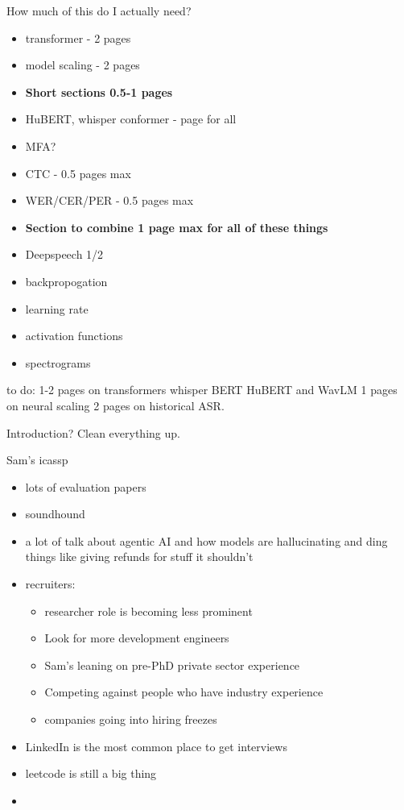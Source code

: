 How much of this do I actually need?
\begin{itemize}
    \item transformer - 2 pages
    \item model scaling - 2 pages
    \item \textbf{Short sections 0.5-1 pages}
    \item HuBERT, whisper conformer - page for all
    \item MFA?
    \item CTC - 0.5 pages max
    \item WER/CER/PER - 0.5 pages max
    \item \textbf{Section to combine 1 page max for all of these things}
    \item Deepspeech 1/2
    \item backpropogation
    \item learning rate
    \item activation functions
    \item spectrograms
\end{itemize}

to do:
1-2 pages on transformers whisper BERT HuBERT and WavLM
1 pages on neural scaling
2 pages on historical ASR.

Introduction?
Clean everything up.

Sam's icassp
\begin{itemize}
    \item lots of evaluation papers
    \item soundhound 
    \item a lot of talk about agentic AI and how models are hallucinating and ding things like giving refunds for stuff it shouldn't 
    \item recruiters:
    \begin{itemize}
        \item researcher role is becoming less prominent
        \item Look for more development engineers
        \item Sam's leaning on pre-PhD private sector experience
        \item Competing against people who have industry experience
        \item companies going into hiring freezes
    \end{itemize}
    \item LinkedIn is the most common place to get interviews
    \item leetcode is still a big thing
    \item 
\end{itemize}
